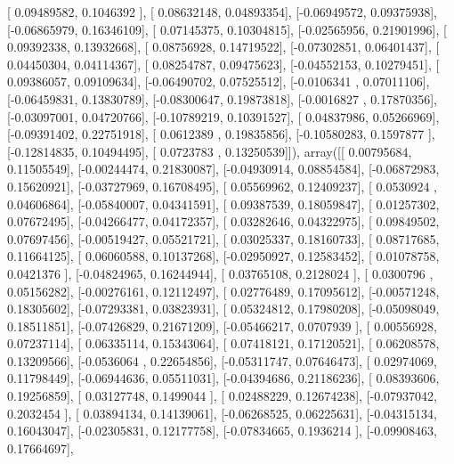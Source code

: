 \documentclass{article}
\begin{document}
       [ 0.09489582,  0.1046392 ],
       [ 0.08632148,  0.04893354],
       [-0.06949572,  0.09375938],
       [-0.06865979,  0.16346109],
       [ 0.07145375,  0.10304815],
       [-0.02565956,  0.21901996],
       [ 0.09392338,  0.13932668],
       [ 0.08756928,  0.14719522],
       [-0.07302851,  0.06401437],
       [ 0.04450304,  0.04114367],
       [ 0.08254787,  0.09475623],
       [-0.04552153,  0.10279451],
       [ 0.09386057,  0.09109634],
       [-0.06490702,  0.07525512],
       [-0.0106341 ,  0.07011106],
       [-0.06459831,  0.13830789],
       [-0.08300647,  0.19873818],
       [-0.0016827 ,  0.17870356],
       [-0.03097001,  0.04720766],
       [-0.10789219,  0.10391527],
       [ 0.04837986,  0.05266969],
       [-0.09391402,  0.22751918],
       [ 0.0612389 ,  0.19835856],
       [-0.10580283,  0.1597877 ],
       [-0.12814835,  0.10494495],
       [ 0.0723783 ,  0.13250539]]), array([[ 0.00795684,  0.11505549],
       [-0.00244474,  0.21830087],
       [-0.04930914,  0.08854584],
       [-0.06872983,  0.15620921],
       [-0.03727969,  0.16708495],
       [ 0.05569962,  0.12409237],
       [ 0.0530924 ,  0.04606864],
       [-0.05840007,  0.04341591],
       [ 0.09387539,  0.18059847],
       [ 0.01257302,  0.07672495],
       [-0.04266477,  0.04172357],
       [ 0.03282646,  0.04322975],
       [ 0.09849502,  0.07697456],
       [-0.00519427,  0.05521721],
       [ 0.03025337,  0.18160733],
       [ 0.08717685,  0.11664125],
       [ 0.06060588,  0.10137268],
       [-0.02950927,  0.12583452],
       [ 0.01078758,  0.0421376 ],
       [-0.04824965,  0.16244944],
       [ 0.03765108,  0.2128024 ],
       [ 0.0300796 ,  0.05156282],
       [-0.00276161,  0.12112497],
       [ 0.02776489,  0.17095612],
       [-0.00571248,  0.18305602],
       [-0.07293381,  0.03823931],
       [ 0.05324812,  0.17980208],
       [-0.05098049,  0.18511851],
       [-0.07426829,  0.21671209],
       [-0.05466217,  0.0707939 ],
       [ 0.00556928,  0.07237114],
       [ 0.06335114,  0.15343064],
       [ 0.07418121,  0.17120521],
       [ 0.06208578,  0.13209566],
       [-0.0536064 ,  0.22654856],
       [-0.05311747,  0.07646473],
       [ 0.02974069,  0.11798449],
       [-0.06944636,  0.05511031],
       [-0.04394686,  0.21186236],
       [ 0.08393606,  0.19256859],
       [ 0.03127748,  0.1499044 ],
       [ 0.02488229,  0.12674238],
       [-0.07937042,  0.2032454 ],
       [ 0.03894134,  0.14139061],
       [-0.06268525,  0.06225631],
       [-0.04315134,  0.16043047],
       [-0.02305831,  0.12177758],
       [-0.07834665,  0.1936214 ],
       [-0.09908463,  0.17664697],
\end{document}
